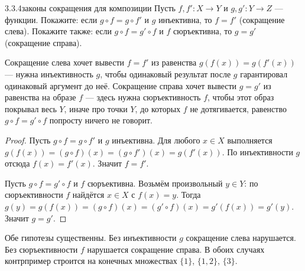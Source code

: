 \begin{exercise}{3.3.4}{законы сокращения для композиции}
Пусть $f,f':X\to Y$ и $g,g':Y\to Z$ — функции. Покажите: если $g\circ f = g\circ f'$ и $g$
инъективна, то $f=f'$ (сокращение слева). Покажите также: если $g\circ f = g'\circ f$ и $f$
сюръективна, то $g=g'$ (сокращение справа).
\end{exercise}

\begin{intuition}
Сокращение слева хочет вывести $f=f'$ из равенства $g(f(x))=g(f'(x))$ — нужна инъективность
$g$, чтобы одинаковый результат после $g$ гарантировал одинаковый аргумент до неё. Сокращение
справа хочет вывести $g=g'$ из равенства на образе $f$ — здесь нужна сюръективность $f$,
чтобы этот образ покрывал весь $Y$, иначе про точки $Y$, до которых $f$ не дотягивается,
равенство $g\circ f=g'\circ f$ попросту ничего не говорит.
\end{intuition}

\begin{proof}
 Пусть $g\circ f=g\circ f'$ и $g$ инъективна. Для любого
$x\in X$ выполняется $g(f(x))=(g\circ f)(x)=(g\circ f')(x)=g(f'(x))$. По инъективности $g$
отсюда $f(x)=f'(x)$. Значит $f=f'$.

 Пусть $g\circ f=g'\circ f$ и $f$ сюръективна. Возьмём
произвольный $y\in Y$: по сюръективности $f$ найдётся $x\in X$ с $f(x)=y$. Тогда
$g(y)=g(f(x))=(g\circ f)(x)=(g'\circ f)(x)=g'(f(x))=g'(y)$. Значит $g=g'$.
\end{proof}

\begin{remark}
Обе гипотезы существенны. Без инъективности $g$ сокращение слева нарушается. Без
сюръективности $f$ нарушается сокращение справа. В обоих случаях контрпример строится на
конечных множествах $\{1\}$, $\{1,2\}$, $\{3\}$.
\end{remark}

